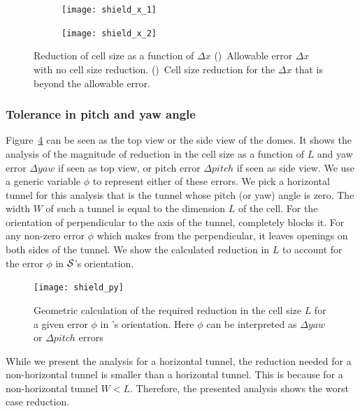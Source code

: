 \documentclass[a4paper]{report}
\begin{document}
\begin{figure}[ht]
    \centering
    \begin{subfigure}{0.48\textwidth}
         \texttt{[image: shield\_x\_1]}
        \caption{}
        \label{fig:shield_xa}
    \end{subfigure} 
    \begin{subfigure}{0.48\textwidth}
         \texttt{[image: shield\_x\_2]}
        \caption{}
        \label{fig:shield_xb}
    \end{subfigure}
    \caption{
    Reduction of cell size as a function of $\Delta x$
     ()~Allowable error $\Delta x$ with no cell size reduction.
    ()~Cell size reduction for the $\Delta x$ that is beyond the allowable error.
    }
\label{fig:shield_x}
\end{figure}

\subsubsection{Tolerance in pitch and yaw angle}
Figure~\ref{fig:shield_py} can be seen as the top view or the side view of the domes. It shows the analysis of the magnitude of reduction in the cell size as a function of $L$ and yaw error $\Delta yaw$ if seen as top view, or pitch error $\Delta pitch$ if seen as side view. We use a generic variable $\phi$ to represent either of these errors.
We pick a horizontal tunnel for this analysis that is the tunnel whose pitch (or yaw) angle is zero.
The width $W$ of such a tunnel is equal to the dimension $L$ of the cell. For the orientation of \calS perpendicular to the axis of the tunnel, \calS completely blocks it. For any non-zero error $\phi$ which \calS makes from the perpendicular, it leaves openings on both sides of the tunnel.
We show the calculated reduction in $L$ to account for the error $\phi$ in $\mathcal{S}$'s orientation.

\begin{figure}[ht]
\centering
 \texttt{[image: shield\_py]}
\caption{Geometric calculation of the required reduction in the cell size $L$ for a given error $\phi$ in \calS's orientation. Here $\phi$ can be interpreted as $\Delta yaw$ or $\Delta pitch$ errors}
\label{fig:shield_py}
\end{figure}

While we present the analysis for a horizontal tunnel, the reduction needed for a non-horizontal tunnel is smaller than a horizontal tunnel. This is because for a non-horizontal tunnel $W < L$. Therefore, the presented analysis shows the worst case reduction.
\end{document}
